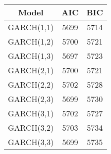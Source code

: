 \begin{tabular}{ccc}
  \toprule
  \textbf{Model} & \textbf{AIC} & \textbf{BIC} \\\midrule
  GARCH(1,1) & 5699 & 5714 \\
  GARCH(1,2) & 5700 & 5721 \\
  GARCH(1,3) & 5697 & 5723 \\
  GARCH(2,1) & 5700 & 5721 \\
  GARCH(2,2) & 5702 & 5728 \\
  GARCH(2,3) & 5699 & 5730 \\
  GARCH(3,1) & 5702 & 5727 \\
  GARCH(3,2) & 5703 & 5734 \\
  GARCH(3,3) & 5699 & 5735 \\\bottomrule
\end{tabular}

